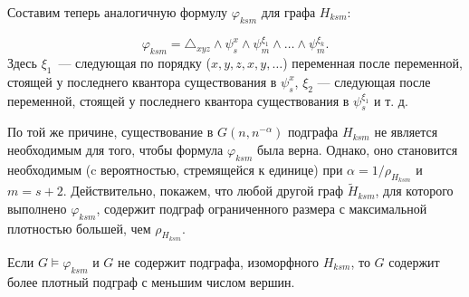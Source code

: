 Составим теперь аналогичную формулу $\varphi_{ksm}$ для графа $H_{ksm}$:

\[ \varphi_{ksm} =  \triangle_{xyz} \wedge \psi_{s}^{x} \wedge \psi_{m}^{\xi_1} \wedge \ldots \wedge \psi_{m}^{\xi_{k}} .\]
Здесь $\xi_1$~--- следующая по порядку ($x,y,z,x,y,\ldots$) переменная после переменной, стоящей у последнего квантора существования в $\psi^x_s$, $\xi_2$ --- следующая после переменной, стоящей у последнего квантора существования в $\psi^{\xi_1}_s$ и т. д.




По той же причине, существование в $G(n, n^{-\alpha})$ подграфа $H_{ksm}$ не является необходимым для того, чтобы формула $\varphi_{ksm}$ была верна.
Однако, оно становится необходимым (c вероятностью, стремящейся к единице) при $\alpha = 1/\rho_{H_{ksm}}$ и $m = s+2$. 
Действительно, покажем, что любой другой граф $\tilde H_{ksm}$, для которого выполнено $\varphi_{ksm}$, содержит подграф ограниченного размера с максимальной плотностью большей, чем $\rho_{H_{ksm}}$.

\begin{Lem} 
\label{lem:min_ro_Hksm}
Если $G \vDash \varphi_{ksm}$ и $G$ не содержит подграфа, изоморфного $H_{ksm}$, то $G$ содержит более плотный подграф с меньшим числом вершин.
\end{Lem}

